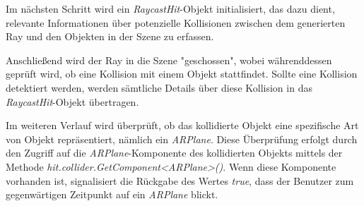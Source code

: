 Im nächsten Schritt wird ein \textit{RaycastHit}-Objekt initialisiert, das dazu dient, relevante Informationen über
potenzielle Kollisionen zwischen dem generierten Ray und den Objekten in der Szene zu erfassen.

Anschließend wird der Ray in die Szene "geschossen", wobei währenddessen geprüft wird, ob eine Kollision mit einem Objekt
stattfindet. Sollte eine Kollision detektiert werden, werden sämtliche Details über diese Kollision in das \textit{RaycastHit}-Objekt
übertragen.

Im weiteren Verlauf wird überprüft, ob das kollidierte Objekt eine spezifische Art von Objekt repräsentiert, nämlich ein
\textit{ARPlane}. Diese Überprüfung erfolgt durch den Zugriff auf die \textit{ARPlane}-Komponente des kollidierten Objekts
mittels der Methode \textit{hit.collider.GetComponent<ARPlane>()}. Wenn diese Komponente vorhanden ist, signalisiert die
Rückgabe des Wertes \textit{true}, dass der Benutzer zum gegenwärtigen Zeitpunkt auf ein \textit{ARPlane} blickt.

